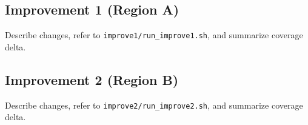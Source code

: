 \subsection{Improvement 1 (Region A)}
Describe changes, refer to \texttt{improve1/run\_improve1.sh}, and summarize coverage delta.

\subsection{Improvement 2 (Region B)} Describe changes, refer to
\texttt{improve2/run\_improve2.sh}, and summarize coverage delta.
